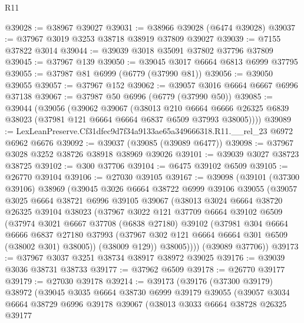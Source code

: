 \begin{lexlean}{R11}
\begin{coremodule}
@39028 := @38967 @39027
@39031 := @38966 @39028 (@6474 @39028)
@39037 := @37967 @3019 @3253 @38718 @38919 @37809 @39027
@39039 := @7155 @37822 @3014
@39044 := @39039 @3018 @35091 @37802 @37796 @37809
@39045 := @37967 @139
@39050 := @39045 @3017 @6664 @6813 @6999 @37795
@39055 := @37987 @81 @6999 (@6779 (@37990 @81))
@39056 := @39050 @39055
@39057 := @37967 @152
@39062 := @39057 @3016 @6664 @6667 @6996 @37138
@39067 := @37987 @50 @6996 (@6779 (@37990 @50))
@39085 := @39044
    (@39056
      (@39062
        @39067
        (@38013
          @210
          @6664
          @6666
          @26325
          @6839
          @38023
          (@37981 @121 @6664 @6664 @6837 @6509 @37993 @38005))))
@39089 := LexLeanPreserve.Cf31dfec9d7f34a9133ae65a349666318.R11.__rel_23 @6972 @6962 @6676
@39092 := @39037 (@39085 (@39089 @6477))
@39098 := @37967 @3028 @3252 @38726 @38918 @38969 @39026
@39101 := @39039 @3027 @38723 @38725
@39102 := @300 @37706
@39104 := @6475 @39102 @6509
@39105 := @26770 @39104
@39106 := @27030 @39105
@39167 := @39098
    (@39101
      (@37300 @39106)
      @38969
      (@39045
        @3026
        @6664
        @38722
        @6999
        @39106
        @39055
        (@39057
          @3025
          @6664
          @38721
          @6996
          @39105
          @39067
          (@38013
            @3024
            @6664
            @38720
            @26325
            @39104
            @38023
            (@37967
              @3022
              @121
              @37709
              @6664
              @39102
              @6509
              (@37974
                @3021
                @6667
                @37708
                (@6838 @27180)
                @39102
                (@37981
                  @304
                  @6664
                  @6666
                  @6837
                  @27180
                  @37993
                  (@37967 @302 @121 @6664 @6664 @301 @6509 (@38002 @301) @38005))
                (@38009 @129))
              @38005))))
      (@39089 @37706))
@39173 := @37967 @3037 @3251 @38734 @38917 @38972 @39025
@39176 := @39039 @3036 @38731 @38733
@39177 := @37962 @6509
@39178 := @26770 @39177
@39179 := @27030 @39178
@39214 := @39173
    (@39176
      (@37300 @39179)
      @38972
      (@39045
        @3035
        @6664
        @38730
        @6999
        @39179
        @39055
        (@39057
          @3034
          @6664
          @38729
          @6996
          @39178
          @39067
          (@38013
            @3033
            @6664
            @38728
            @26325
            @39177

\end{coremodule}
\end{lexlean}
